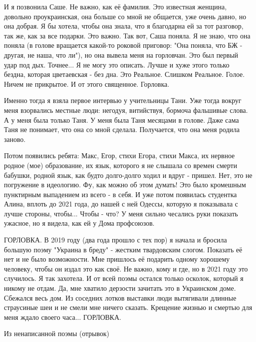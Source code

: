 И я позвонила Саше. Не важно, как её фамилия. Это известная женщина, довольно
проукраинская, она больше со мной не общается, уже очень давно, но она добрая.
Я бы хотела, чтобы она знала, что я благодарна ей за тот разговор, так же, как
за все подарки. Это важно. Так вот, Саша поняла. Я не знаю, что она поняла (в
голове вращается какой-то роковой приговор: "Она поняла, что БЖ - другая, не
наша, что ли"), но она вывела меня на горловчан. Это был первый удар под дых.
Точнее... Я не могу это описать. Лучше и хуже этого только бездна, которая
цветаевская - без дна. Это Реальное. Слишком Реальное. Голое. Ничем не
прикрытое. И от этого священное. Горловка. 

Именно тогда я взяла первое интервью у учительницы Тани. Уже тогда вокруг меня
взорвались местные люди: негодуя, витийствуя, бормоча фальшивые слова. А у меня
была только Таня. У меня была Таня месяцами в голове. Даже сама Таня не
понимает, что она со мной сделала. Получается, что она меня родила заново. 

Потом появились ребята: Макс, Егор, стихи Егора, стихи Макса, их нервное родное
(мое) образование, их язык, которого я не слышала со времен смерти бабушки,
родной язык, как будто долго-долго ходил и вдруг - пришел. Нет, это не
погружение в идеологию. Фу, как можно об этом думать! Это было кромешным
пунктирным выпадением из всего - в себя. И уже потом появилась студентка Алина,
вплоть до 2021 года, до нашей с ней Одессы, которую я показывала с лучше
стороны, чтобы... Чтобы - что? У меня сильно чесались руки показать ужасное, но
я видела, как ей у Дома профсоюзов. 

ГОРЛОВКА. В 2019 году (два года прошло с тех пор) я начала и бросила большую
поэму "Украина в бреду" - жестким твардовским слогом. Показать её нет и не было
возможности. Мне пришлось её подарить одному хорошему человеку, чтобы он издал
это как своё. Не важно, кому и где, но в 2021 году это случилось. Я так
захотела. И от всей поэмы остался только осколок, который я никому не отдам.
Да, мне хватило дерзости зачитать это в Украинском доме. Сбежался весь дом. Из
соседних лотков выставки люди вытягивали длинные страусиные шеи и не смели мне
ничего сказать. Крещение жизнью и смертью для меня ждало своего часа...
ГОРЛОВКА.

Из ненаписанной поэмы (отрывок)

